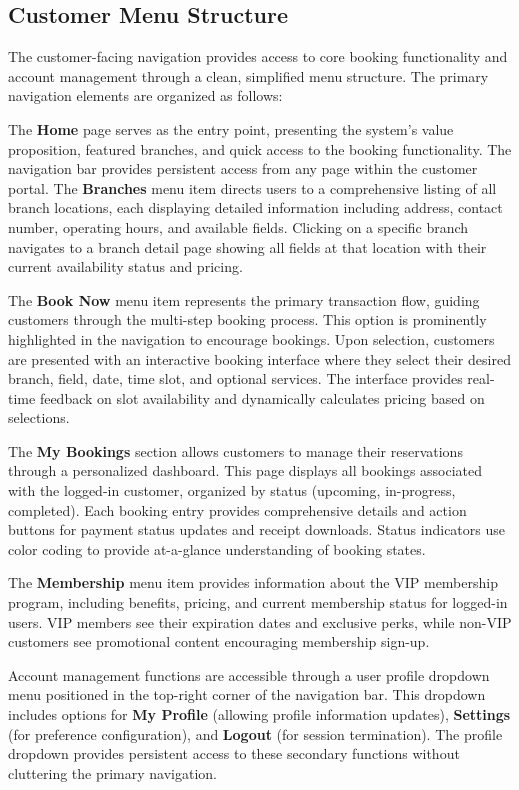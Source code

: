 \subsection{Customer Menu Structure}

The customer-facing navigation provides access to core booking functionality and account management through a clean, simplified menu structure. The primary navigation elements are organized as follows:

The \textbf{Home} page serves as the entry point, presenting the system's value proposition, featured branches, and quick access to the booking functionality. The navigation bar provides persistent access from any page within the customer portal. The \textbf{Branches} menu item directs users to a comprehensive listing of all branch locations, each displaying detailed information including address, contact number, operating hours, and available fields. Clicking on a specific branch navigates to a branch detail page showing all fields at that location with their current availability status and pricing.

The \textbf{Book Now} menu item represents the primary transaction flow, guiding customers through the multi-step booking process. This option is prominently highlighted in the navigation to encourage bookings. Upon selection, customers are presented with an interactive booking interface where they select their desired branch, field, date, time slot, and optional services. The interface provides real-time feedback on slot availability and dynamically calculates pricing based on selections.

The \textbf{My Bookings} section allows customers to manage their reservations through a personalized dashboard. This page displays all bookings associated with the logged-in customer, organized by status (upcoming, in-progress, completed). Each booking entry provides comprehensive details and action buttons for payment status updates and receipt downloads. Status indicators use color coding to provide at-a-glance understanding of booking states.

The \textbf{Membership} menu item provides information about the VIP membership program, including benefits, pricing, and current membership status for logged-in users. VIP members see their expiration dates and exclusive perks, while non-VIP customers see promotional content encouraging membership sign-up.

Account management functions are accessible through a user profile dropdown menu positioned in the top-right corner of the navigation bar. This dropdown includes options for \textbf{My Profile} (allowing profile information updates), \textbf{Settings} (for preference configuration), and \textbf{Logout} (for session termination). The profile dropdown provides persistent access to these secondary functions without cluttering the primary navigation.

